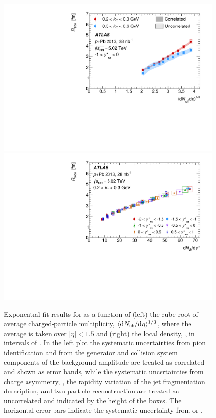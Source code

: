 \begin{figure}[ht]
\centering
\includegraphics[width=0.49\linewidth]{canqosl_Rside_vs_avg_mult.pdf}
\includegraphics[width=0.49\linewidth]{canqosl_Rside_kt1_vs_mult.pdf}
\caption{Exponential fit results for \Rside as a function of (left) the cube root of average charged-particle multiplicity, $\langle\mathrm{d}\mbox{$N_{\mathrm{ch}}$}/\mathrm{d}\eta\rangle^{1/3}$, where the average is taken over $|\eta| < 1.5$ and (right) the local density, \dNdy, in intervals of \kys. In the left plot the systematic uncertainties from pion identification and from the generator and collision system components of the background amplitude are treated as correlated and shown as error bands, while the systematic uncertainties from charge asymmetry, \Reff, the rapidity variation of the jet fragmentation description, and two-particle reconstruction are treated as uncorrelated and indicated by the height of the boxes. The horizontal error bars indicate the systematic uncertainty from \avgdNdeta or \dNdy.}
\label{fig:results_Rside_mult}
\end{figure}

